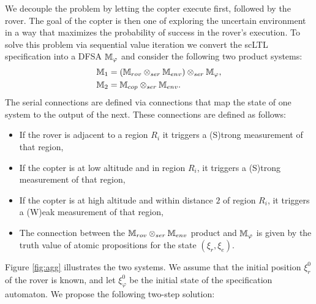 \documentclass[conference]{IEEEtran}
\begin{document}
We decouple the problem by letting the copter execute first, followed by the rover. The goal of the copter is then one of exploring the uncertain environment in a way that maximizes the probability of success in the rover's execution. To solve this problem via sequential value iteration we convert the scLTL specification into a DFSA $\mathbb{M}_{\varphi}$ and consider the following two product systems:
\begin{equation}
\begin{aligned}
  \mathbb{M}_{1} &= \left( \mathbb{M}_{rov} \otimes_{ser} \mathbb{M}_{env} \right) \otimes_{ser} \mathbb{M}_{\varphi}, \\
  \mathbb{M}_{2} &= \mathbb{M}_{cop} \otimes_{ser} \mathbb{M}_{env}.
\end{aligned}
\end{equation}
The serial connections are defined via connections that map the state of one system to the output of the next. These connections are defined as follows:
\begin{itemize}
  \item If the rover is adjacent to a region $R_i$ it triggers a (S)trong measurement of that region,
  \item If the copter is at low altitude and in region $R_i$, it triggers a (S)trong measurement of that region,
  \item If the copter is at high altitude and within distance $2$ of region $R_i$, it triggers a (W)eak measurement of that region,
  \item The connection between the $\mathbb{M}_{rov} \otimes_{ser} \mathbb{M}_{env}$ product and $\mathbb{M}_{\varphi}$ is given by the truth value of atomic propositions for the state $(\xi_r, \xi_e)$.
\end{itemize}
Figure \ref{fig:agg} illustrates the two systems. We assume that the initial position $\xi_r^0$ of the rover is known, and let $\xi_\varphi^0$ be the initial state of the specification automaton. We propose the following two-step solution:
\end{document}
